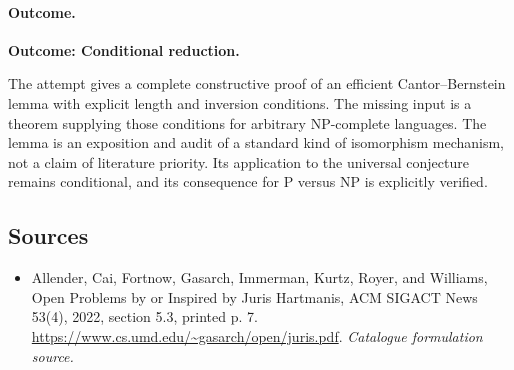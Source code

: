 \documentclass[11pt,a4paper]{article}
\numberwithin{equation}{section}
\begin{document}
\paragraph{Outcome.}
\textbf{Outcome: Conditional reduction.}

The attempt gives a complete constructive proof of an efficient
Cantor--Bernstein lemma with explicit length and inversion conditions.
The missing input is a theorem supplying those conditions for arbitrary
NP-complete languages. The lemma is an exposition and audit of a standard
kind of isomorphism mechanism, not a claim of literature priority. Its
application to the universal conjecture remains conditional, and its
consequence for $\mathrm P$ versus $\mathrm{NP}$ is explicitly verified.
\subsection{Sources}
\begin{itemize}\raggedright
\item[\textnormal{[S1]}]\hypertarget{source:175:1}{} Allender, Cai, Fortnow, Gasarch, Immerman, Kurtz, Royer, and Williams, Open Problems by or Inspired by Juris Hartmanis, ACM SIGACT News 53(4), 2022, section 5.3, printed p. 7.
\url{https://www.cs.umd.edu/~gasarch/open/juris.pdf}.
{\small\textit{Catalogue formulation source.}}
\end{itemize}
\end{document}

